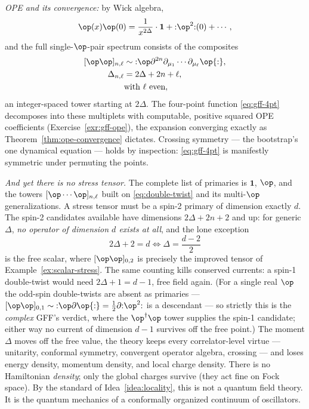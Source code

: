 \begin{eexample}
\emph{OPE and its convergence:} by Wick algebra,
\begin{equation}
\op(x)\op(0) = \frac{1}{x^{2\Delta}}\cdot\mathbf 1
+ {:}\op^2{:}(0) + \cdots,
\end{equation}
and the full single-$\op$-pair spectrum consists of the 
composites
\begin{equation}
\begin{aligned}
[\op\op]_{n,\ell}
&\sim {:}\op\partial^{2n}\partial_{\mu_1}\cdots\partial_{\mu_\ell}\op{:},\\
\Delta_{n, \ell} &= 2\Delta + 2n + \ell,\\
&\text{with } \ell \text{ even},
\end{aligned}
\label{eq:double-twist}
\end{equation}
an integer-spaced tower starting at $2\Delta$. The four-point function
\eqref{eq:gff-4pt} decomposes into these multiplets with computable, positive
squared OPE coefficients (Exercise~\ref{exr:gff-ope}), the expansion
converging exactly as Theorem~\ref{thm:ope-convergence} dictates. Crossing
symmetry --- the bootstrap's one dynamical equation --- holds by inspection:
\eqref{eq:gff-4pt} is manifestly symmetric under permuting the points.

\emph{And yet there is no stress tensor.} The complete list of primaries is
$\mathbf 1$, $\op$, and the towers $[\op\cdots\op]_{n,\ell}$ built on
\eqref{eq:double-twist} and its multi-$\op$ generalizations. A stress tensor
must be a spin-2 primary of dimension exactly $d$. The spin-2 candidates
available have dimensions $2\Delta + 2n + 2$ and up: for generic $\Delta$,
\emph{no operator of dimension $d$ exists at all}, and the lone exception
\begin{equation}
2\Delta + 2 = d
\Longleftrightarrow
\Delta = \frac{d-2}{2}
\end{equation}
is the free scalar, where $[\op\op]_{0,2}$ is precisely the improved tensor
of Example~\ref{ex:scalar-stress}. The same counting kills conserved
currents: a spin-1 double-twist would need $2\Delta + 1 = d - 1$, free field
again. (For a single real $\op$ the odd-spin double-twists are absent as
primaries --- $[\op\op]_{0,1} \sim {:}\op\partial\op{:} =
\tfrac12\partial{:}\op^2{:}$ is a descendant --- so strictly this is the
\emph{complex} GFF's verdict, where the $\op^\dagger\op$ tower supplies the
spin-1 candidate; either way no current of dimension $d-1$ survives off the
free point.) The moment $\Delta$ moves off the free value, the theory keeps every
correlator-level virtue --- unitarity, conformal symmetry, convergent
operator algebra, crossing --- and loses energy density, momentum density,
and local charge density. There is no Hamiltonian \emph{density}; only the
global charges survive (they act fine on Fock space). By the standard of
Idea~\ref{idea:locality}, this is not a quantum field theory. It is the
quantum mechanics of a conformally organized continuum of oscillators.
\end{eexample}

